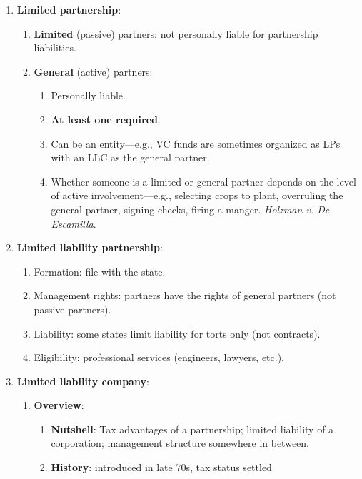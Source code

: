 \begin{enumerate}
    \item \textbf{Limited partnership}:
    \begin{enumerate}
        \item \textbf{Limited} (passive) partners: not personally liable for 
        partnership liabilities.
        \item \textbf{General} (active) partners:
        \begin{enumerate}
            \item Personally liable.
            \item \textbf{At least one required}.
            \item Can be an entity---e.g., VC funds are sometimes organized as 
            LPs with an LLC as the general partner.
        \item Whether someone is a limited or general partner depends on the 
        level of active involvement---e.g., selecting crops to plant, 
        overruling the general partner, signing checks, firing a manger. 
        \emph{Holzman v. De Escamilla}. %
        \end{enumerate}
    \end{enumerate}
    \item \textbf{Limited liability partnership}:
    \begin{enumerate}
        \item Formation: file with the state.
        \item Management rights: partners have the rights of general partners 
        (not passive partners).
        \item Liability: some states limit liability for torts only (not 
        contracts).
        \item Eligibility: professional services (engineers, lawyers, etc.).
    \end{enumerate}
    \item \textbf{Limited liability company}:
    \begin{enumerate}
        \item \textbf{Overview}:
        \begin{enumerate}
            \item \textbf{Nutshell}: Tax advantages of a partnership; limited 
            liability of a corporation; management structure somewhere in 
            between.
            \item \textbf{History}: introduced in late 70s, tax status settled 

\end{enumerate}
\end{enumerate}
\end{enumerate}
